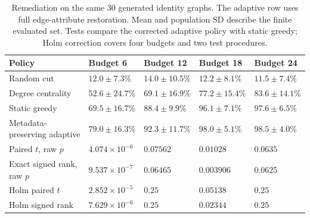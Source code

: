 \begin{table}[tbp]
\centering
\caption{Remediation on the same 30 generated identity graphs. The adaptive row uses full edge-attribute restoration. Mean and population SD describe the finite evaluated set. Tests compare the corrected adaptive policy with static greedy; Holm correction covers four budgets and two test procedures.}
\label{tab:stackelberg_results}
\evidencetable

\begin{tabularx}{\linewidth}{@{}Y*{4}{>{\centering\arraybackslash}p{.145\linewidth}}@{}}
\toprule
Policy & Budget 6 & Budget 12 & Budget 18 & Budget 24 \\
\midrule
Random cut & $12.0 \pm 7.3\%$ & $14.0 \pm 10.5\%$ & $12.2 \pm 8.1\%$ & $11.5 \pm 7.4\%$ \\
Degree centrality & $52.6 \pm 24.7\%$ & $69.1 \pm 16.9\%$ & $77.2 \pm 15.4\%$ & $83.6 \pm 14.1\%$ \\
Static greedy & $69.5 \pm 16.7\%$ & $88.4 \pm 9.9\%$ & $96.1 \pm 7.1\%$ & $97.6 \pm 6.5\%$ \\
Metadata-preserving adaptive & $79.0 \pm 16.3\%$ & $92.3 \pm 11.7\%$ & $98.0 \pm 5.1\%$ & $98.5 \pm 4.0\%$ \\
\midrule
Paired $t$, raw $p$ & $4.074 \times 10^{-6}$ & $0.07562$ & $0.01028$ & $0.0635$ \\
Exact signed rank, raw $p$ & $9.537 \times 10^{-7}$ & $0.06465$ & $0.003906$ & $0.0625$ \\
Holm paired $t$ & $2.852 \times 10^{-5}$ & $0.25$ & $0.05138$ & $0.25$ \\
Holm signed rank & $7.629 \times 10^{-6}$ & $0.25$ & $0.02344$ & $0.25$ \\
\bottomrule
\end{tabularx}
\end{table}
